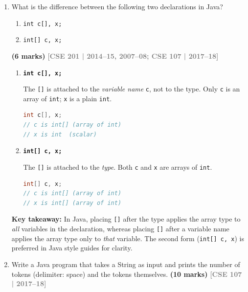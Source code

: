 \documentclass[12pt,a3paper]{article}
\newcommand{\yr}[1]{\hfill\textcolor{gray}{\small\textbf{[#1]}}}
\newcommand{\mk}[1]{\textcolor{orange!70!black}{\small\textbf{(#1 marks)}}}
\begin{document}
\begin{enumerate}
\item What is the difference between the following two declarations in Java?
\begin{enumerate}
  \item \texttt{int c[], x;}
  \item \texttt{int[] c, x;}
\end{enumerate}
\mk{6}
\yr{CSE 201 | 2014--15, 2007--08; CSE 107 | 2017--18}

\begin{tcolorbox}[enhanced,breakable,ansbox,
  colback=cB!4,colframe=cB,boxrule=0.8pt,arc=5pt,
  title={\textbf{Answer --- \texttt{int c[], x} vs.\ \texttt{int[] c, x}}},
  fonttitle=\bfseries\color{white},colbacktitle=cB]

\begin{enumerate}[label=(\alph*)]
  \item \textbf{\texttt{int c[], x;}}

    The \texttt{[]} is attached to the \emph{variable name}
    \texttt{c}, not to the type.  Only \texttt{c} is an array of
    \texttt{int}; \texttt{x} is a plain \texttt{int}.

\begin{lstlisting}[language=Java]
int c[], x;
// c is int[] (array of int)
// x is int  (scalar)
\end{lstlisting}

  \item \textbf{\texttt{int[] c, x;}}

    The \texttt{[]} is attached to the \emph{type}.  Both \texttt{c}
    and \texttt{x} are arrays of \texttt{int}.

\begin{lstlisting}[language=Java]
int[] c, x;
// c is int[] (array of int)
// x is int[] (array of int)
\end{lstlisting}
\end{enumerate}

\textbf{Key takeaway:} In Java, placing \texttt{[]} after the type
applies the array type to \emph{all} variables in the declaration,
whereas placing \texttt{[]} after a variable name applies the array
type only to \emph{that} variable.  The second form (\texttt{int[] c,
x}) is preferred in Java style guides for clarity.

\end{tcolorbox}

\item Write a Java program that takes a String as input and prints the number of tokens (delimiter: space) and the tokens themselves. \mk{10}
\yr{CSE 107 | 2017--18}


\end{enumerate}
\end{document}
